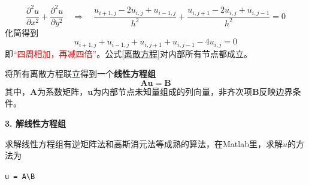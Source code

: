 \begin{equation}
	\dfrac{\partial^2 u}{\partial x^2} + \dfrac{\partial^2 u}{\partial y^2} \quad \Rightarrow \quad \dfrac{u_{i+1,j} - 2u_{i,j}+u_{i-1,j}}{h^2} + \dfrac{u_{i,j+1}-2u_{i,j}+u_{i,j-1}}{h^2} = 0
\end{equation}
化简得到
\begin{equation}
	u_{i+1,j} + u_{i-1,j} + u_{i,j+1} + u_{i,j-1} -4u_{i,j} = 0
	\label{离散方程}
\end{equation}
即\textcolor{red}{“四周相加，再减四倍”}。公式\eqref{离散方程}对内部所有节点都成立。
\vspace*{0.5em}

将所有离散方程联立得到一个\textbf{线性方程组}
\begin{equation}
	\bm{A}\bm{u}=\bm{B}
\end{equation}
其中，$\bm{A}$为系数矩阵，$\bm{u}$为内部节点未知量组成的列向量，非齐次项$\bm{B}$反映边界条件。
\vspace*{1em}

\noindent \textbf{3. 解线性方程组}

求解线性方程组有逆矩阵法和高斯消元法等成熟的算法，在Matlab里，求解$u$的方法为
\begin{center}
	\lstinline|u = A\B|
\end{center}

